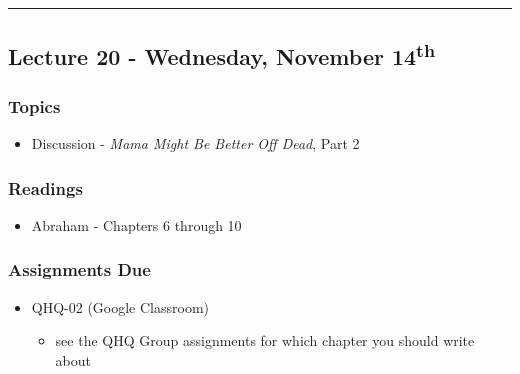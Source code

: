 \documentclass[]{book}
\providecommand{\tightlist}{%
  \setlength{\itemsep}{0pt}\setlength{\parskip}{0pt}}
\theoremstyle{definition}
\theoremstyle{definition}
\theoremstyle{definition}
\theoremstyle{remark}
\begin{document}
\begin{center}\rule{0.5\linewidth}{\linethickness}\end{center}

\hypertarget{lecture-20---wednesday-november-14th}{%
\subsection*{\texorpdfstring{Lecture 20 - Wednesday, November
14\textsuperscript{th}}{Lecture 20 - Wednesday, November 14th}}\label{lecture-20---wednesday-november-14th}}

\hypertarget{topics-23}{%
\subsubsection*{Topics}\label{topics-23}}

\begin{itemize}
\tightlist
\item
  Discussion - \emph{Mama Might Be Better Off Dead}, Part 2
\end{itemize}

\hypertarget{readings-21}{%
\subsubsection*{Readings}\label{readings-21}}

\begin{itemize}
\tightlist
\item
  Abraham - Chapters 6 through 10
\end{itemize}

\hypertarget{assignments-due-5}{%
\subsubsection*{Assignments Due}\label{assignments-due-5}}

\begin{itemize}
\tightlist
\item
  QHQ-02 (Google Classroom)

  \begin{itemize}
  \tightlist
  \item
    see the QHQ Group assignments for which chapter you should write
    about
  \end{itemize}
\end{itemize}
\end{document}
